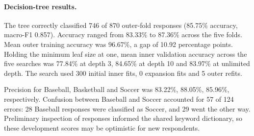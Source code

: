 \paragraph{Decision-tree results.}
The tree correctly classified 746 of 870 outer-fold responses
(85.75\% accuracy, macro-F1 0.857).
Accuracy ranged from 83.33\% to 87.36\%
across the five folds. Mean outer training accuracy was 96.67\%,
a gap of 10.92 percentage points.
Holding the minimum leaf size at one, mean inner validation accuracy across the five
searches was 77.84\% at depth 3, 84.65\% at
depth 10 and 83.97\% at unlimited depth.
The search used 300 initial inner fits, 0 expansion
fits and 5 outer refits.

Precision for Baseball, Basketball and Soccer was 83.22\%, 88.05\%, 85.96\%, respectively.
Confusion between Baseball and Soccer accounted for 57 of 124 errors:
28 Baseball responses were classified as Soccer, and 29 went
the other way. Preliminary inspection of responses informed the shared keyword dictionary,
so these development scores may be optimistic for new respondents.
